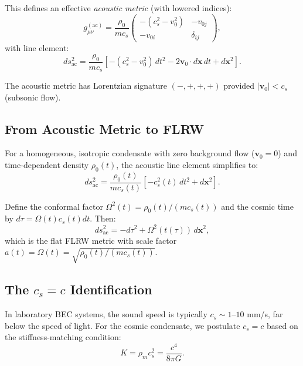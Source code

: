 \documentclass[11pt,a4paper]{article}
\theoremstyle{definition}
\begin{document}
This defines an effective \emph{acoustic metric} (with lowered indices):
\begin{equation}
\label{eq:acoustic_metric}
g_{\mu\nu}^{\mathrm{(ac)}} = \frac{\rho_0}{m c_s}
\begin{pmatrix}
-(c_s^2 - v_0^2) & -v_{0j} \\
-v_{0i} & \delta_{ij}
\end{pmatrix},
\end{equation}
with line element:
\begin{equation}
\label{eq:acoustic_line_element}
ds_{\mathrm{ac}}^2 = \frac{\rho_0}{m c_s} \left[ -(c_s^2 - v_0^2) \, dt^2 - 2 \mathbf{v}_0 \cdot d\mathbf{x} \, dt + d\mathbf{x}^2 \right].
\end{equation}

The acoustic metric has Lorentzian signature $(-,+,+,+)$ provided $|\mathbf{v}_0| < c_s$ (subsonic flow).

\subsection{From Acoustic Metric to FLRW}
\label{sec:acoustic_to_FLRW}

For a homogeneous, isotropic condensate with zero background flow ($\mathbf{v}_0 = 0$) and time-dependent density $\rho_0(t)$, the acoustic line element simplifies to:
\begin{equation}
\label{eq:acoustic_homogeneous}
ds_{\mathrm{ac}}^2 = \frac{\rho_0(t)}{m c_s(t)} \left[ -c_s^2(t) \, dt^2 + d\mathbf{x}^2 \right].
\end{equation}

Define the conformal factor $\Omega^2(t) = \rho_0(t)/(mc_s(t))$ and the cosmic time by $d\tau = \Omega(t) c_s(t) dt$. Then:
\begin{equation}
\label{eq:acoustic_FLRW_form}
ds_{\mathrm{ac}}^2 = -d\tau^2 + \Omega^2(t(\tau)) \, d\mathbf{x}^2,
\end{equation}
which is the flat FLRW metric with scale factor $a(t) = \Omega(t) = \sqrt{\rho_0(t)/(mc_s(t))}$.

\subsection{The $c_s = c$ Identification}
\label{sec:cs_equals_c}

In laboratory BEC systems, the sound speed is typically $c_s \sim 1$--$10$ mm/s, far below the speed of light. For the cosmic condensate, we postulate $c_s = c$ based on the stiffness-matching condition:
\begin{equation}
\label{eq:stiffness_match}
K = \rho_m c_s^2 = \frac{c^4}{8\pi G}.
\end{equation}
\end{document}
